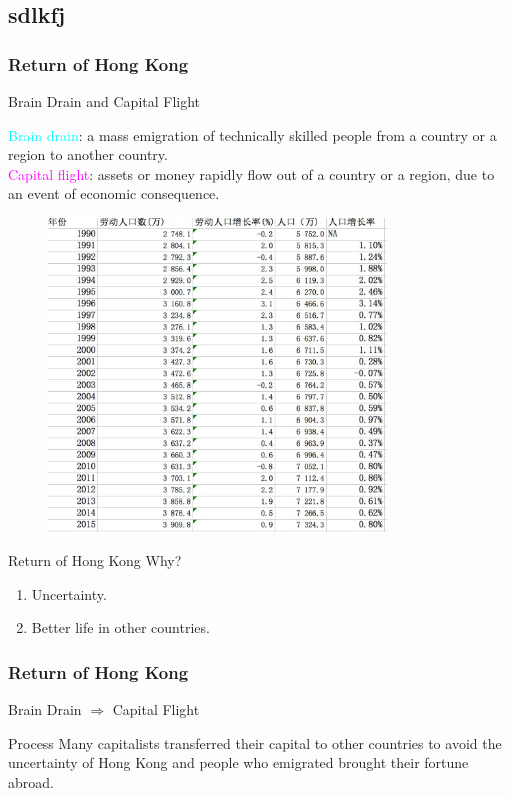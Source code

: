 \documentclass[slidestop,uncompress,mathsans, 12pt]{beamer}
\begin{document}
\subsection{sdlkfj}
\begin{frame}
\frametitle{Return of Hong Kong}
Brain Drain and Capital Flight\\
\begin{definition}
\textcolor{cyan}{Brain drain}: a mass emigration of technically skilled people from a country or a region to another country. \\
\bigskip
\textcolor{magenta}{Capital flight}: assets or money rapidly flow out of a country or a region, due to an event of economic consequence. \\

\end{definition}
\end{frame}
\begin{frame}
\begin{figure}[h]
\centering
\includegraphics[width=0.8\textwidth]{hk15.jpg}
\label{threadsVsSync}
\end{figure}
\end{frame}
\begin{frame}{Return of Hong Kong}
 Why?
\begin{enumerate}
\item Uncertainty.
\bigskip
\item Better life in other countries.
\end{enumerate}
\end{frame}
\begin{frame}
\frametitle{Return of Hong Kong}
Brain Drain $\Longrightarrow$ Capital Flight
%
%
\begin{beamerboxesrounded}[upper=uppercol,lower=lower col,shadow=true]{Process}
Many capitalists transferred their capital to other countries to avoid the uncertainty of Hong Kong and people who emigrated brought their fortune abroad.\\
\end{beamerboxesrounded}
\end{frame}
\end{document}
